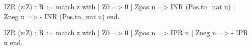 IZR (z:Z) : R :=
  match z with
  | Z0 => 0
  | Zpos n => INR (Pos.to_nat n)
  | Zneg n => - INR (Pos.to_nat n)
  end.

IZR (z:Z) : R :=
  match z with
  | Z0 => 0
  | Zpos n => IPR n
  | Zneg n => - IPR n
  end.
